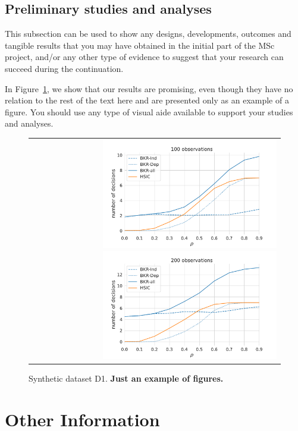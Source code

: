 \documentclass{article}
\begin{document}
\subsection{Preliminary studies and analyses}

This subsection can be used to show any designs, developments, outcomes and tangible results that you may have obtained in the initial part of the MSc project, and/or any other type of evidence to suggest that your research can succeed during the continuation.

In Figure~\ref{fig:2}, we show that our results are promising, even though they have no relation to the rest of the text here and are presented only as an example of a figure. You should use any type of visual aide available to support your studies and analyses.

\begin{figure}[htp]
  \centering
  \begin{tabular}{r}
    \includegraphics[height=1.9in]{100.pdf}
    \includegraphics[height=1.9in]{200.pdf}
  \end{tabular}
  \caption{Synthetic dataset D1. \textbf{Just an example of figures.}}
  \label{fig:2}
\end{figure}


\section{Other Information}
\label{sec:other}
\end{document}
